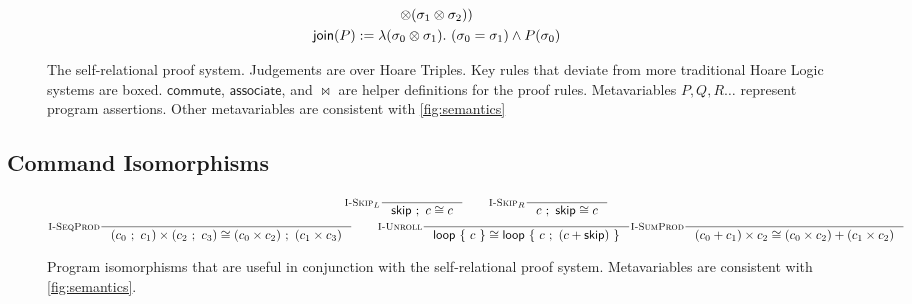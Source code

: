 \documentclass[p.tex]{subfiles}
\begin{document}
\begin{figure}
\begin{spreadlines}{5pt}
\begin{subequations}
\begin{gather*}
  \otimes (\sigma_1 \otimes \sigma_2))\\
  \textsf{join}(P) := \lambda(\sigma_0 \otimes \sigma_1).~(\sigma_0 = \sigma_1) \land P(\sigma_0)
\end{gather*}
\end{subequations}
\end{spreadlines}
\caption{The self-relational proof system. Judgements are over
Hoare Triples. Key rules that deviate from more traditional Hoare
Logic systems are boxed.
$\textsf{commute}$, $\textsf{associate}$, and
$\Join$ are helper definitions for the proof rules.
Metavariables $P, Q, R\ldots$ represent program
assertions. Other metavariables are consistent with
\cref{fig:semantics}}\label{fig:proof-system}
\end{figure}

\subsection{Command Isomorphisms}

\begin{figure}
\begin{spreadlines}{5pt}
\begin{gather*}
  \inference[$\textsc{I-Skip}_L$]{%
  }{%
    \cseq{\cskip}{c} \cong c
  }
  \qquad
  \inference[$\textsc{I-Skip}_R$]{%
  }{%
    \cseq{c}{\cskip} \cong c
  }
  \\
  \inference[\textsc{I-SeqProd}]{%
  }{%
    \cprod{(\cseq{c_0}{c_1})}{(\cseq{c_2}{c_3})} \cong
    \cseq{(\cprod{c_0}{c_2})}{(\cprod{c_1}{c_3})}
  }
  \qquad
  \inference[\textsc{I-Unroll}]{%
  }{%
    \cloop{c} \cong \cloop{\cseq{c}{(\csum{c}{\cskip})}}
  }
  \inference[\textsc{I-SumProd}]{%
  }{%
    \cprod{(\csum{c_0}{c_1})}{c_2} \cong
    \csum{(\cprod{c_0}{c_2})}{(\cprod{c_1}{c_2})}
  }
\end{gather*}
\end{spreadlines}
\caption{%
  Program isomorphisms that are useful in conjunction with the
  self-relational proof system. Metavariables are consistent with
  \cref{fig:semantics}.
}
\end{figure}
\end{document}
